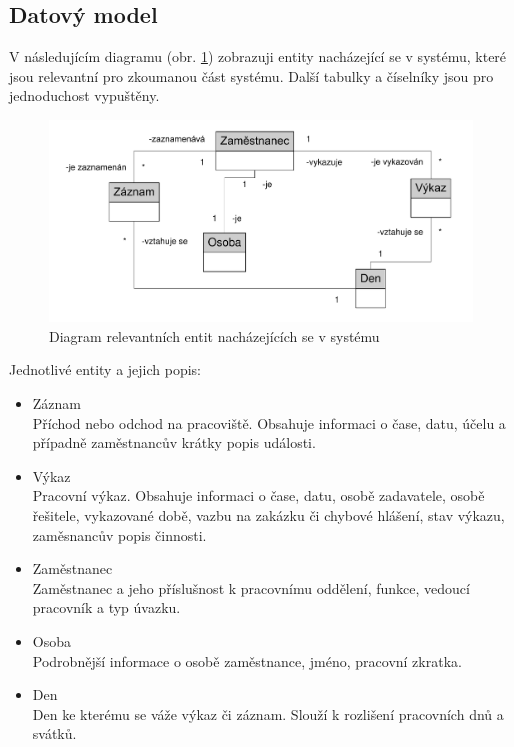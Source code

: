 \documentclass{diplomka}
\begin{document}
\subsection{Datový model}
V následujícím diagramu (obr. \ref{obr:object}) zobrazuji entity nacházející se v systému, které jsou relevantní pro zkoumanou část systému. Další tabulky a číselníky jsou pro jednoduchost vypuštěny.
\begin{figure}[H]
  \centering
  \includegraphics[scale=0.7]{visio/object.pdf}
\caption{Diagram relevantních entit nacházejících se v systému}
\label{obr:object}
\end{figure}
Jednotlivé entity a jejich popis:
\begin{itemize}
\item Záznam\\
Příchod nebo odchod na pracoviště. Obsahuje informaci o čase, datu, účelu a případně zaměstnancův krátky popis události.
\item Výkaz\\
Pracovní výkaz. Obsahuje informaci o čase, datu, osobě zadavatele, osobě řešitele, vykazované době, vazbu na zakázku či chybové hlášení, stav výkazu, zaměsnancův popis činnosti.
\item Zaměstnanec\\
Zaměstnanec a jeho příslušnost k pracovnímu oddělení, funkce, vedoucí pracovník a typ úvazku. 
\item Osoba\\
Podrobnější informace o osobě zaměstnance, jméno, pracovní zkratka.
\item Den\\
Den ke kterému se váže výkaz či záznam. Slouží k rozlišení pracovních dnů a svátků.
\end{itemize}
\end{document}
